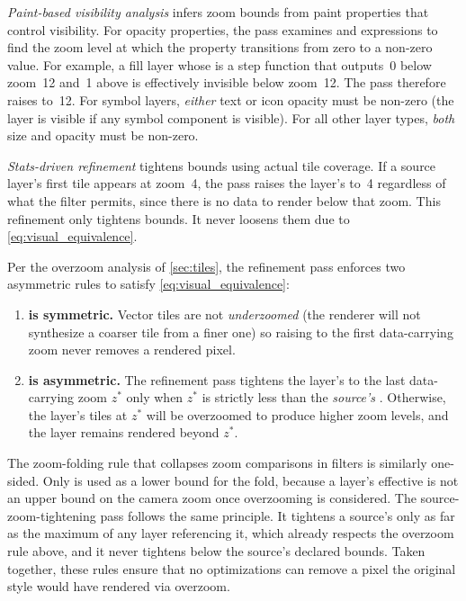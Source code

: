 \emph{Paint-based visibility analysis} infers zoom bounds from paint properties that control visibility.
For opacity properties, the pass examines  and  expressions to find the zoom level at which the property transitions from zero to a non-zero value.
For example, a fill layer whose  is a step function that outputs~0 below zoom~12 and~1 above is effectively invisible below zoom~12.
The pass therefore raises  to~12.
For symbol layers, \emph{either} text or icon opacity must be non-zero (the layer is visible if any symbol component is visible).
For all other layer types, \emph{both} size and opacity must be non-zero.

\emph{Stats-driven refinement} tightens bounds using actual tile coverage.
If a source layer's first tile appears at zoom~4, the pass raises the layer's  to~4 regardless of what the filter permits, since there is no data to render below that zoom.
This refinement only tightens bounds.
It never loosens them due to \cref{eq:visual_equivalence}.

Per the overzoom analysis of \cref{sec:tiles}, the refinement pass enforces two asymmetric rules to satisfy \cref{eq:visual_equivalence}:
\begin{enumerate}
    \item \textbf{ is symmetric.}
    Vector tiles are not \emph{underzoomed} (the renderer will not synthesize a coarser tile from a finer one) so raising  to the first data-carrying zoom never removes a rendered pixel.
    \item \textbf{ is asymmetric.}
    The refinement pass tightens the layer's  to the last data-carrying zoom $z^{*}$ only when $z^{*}$ is strictly less than the \emph{source's} .
Otherwise, the layer's tiles at $z^{*}$ will be overzoomed to produce higher zoom levels, and the layer remains rendered beyond $z^{*}$.
\end{enumerate}
The zoom-folding rule that collapses zoom comparisons in filters is similarly one-sided.
Only  is used as a lower bound for the fold, because a layer's effective  is not an upper bound on the camera zoom once overzooming is considered.
The source-zoom-tightening pass follows the same principle.
It tightens a source's  only as far as the maximum  of any layer referencing it, which already respects the overzoom rule above, and it never tightens below the source's declared bounds.
Taken together, these rules ensure that no optimizations can remove a pixel the original style would have rendered via overzoom.

